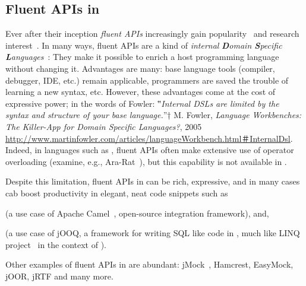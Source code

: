 \subsection{Fluent APIs in \Java}
Ever after their inception \emph{fluent APIs}
  increasingly gain popularity~\cite{Hibernate:06,Freeman:Pryce:06,Larsen:2012} and research
  interest~\cite{Deursen:2000,Kabanov:2008}.
In many ways, fluent APIs are a kind of
  \emph{internal} \emph{\textbf Domain \textbf Specific \textbf Languages}~\cite{VanDeursen:Klint:2000,Hudak:1997,Fowler:2010}:
They make it possible to enrich a host programming language without changing it.
Advantages are many: base language tools (compiler, debugger, IDE, etc.) remain
  applicable, programmers are saved the trouble of learning a new syntax, etc.
However, these advantages come at the cost of expressive power;
  in the words of Fowler:
  ‟\emph{Internal DSLs are limited by the syntax and structure of your base language.}”†
  {M. Fowler, \emph{Language Workbenches: The Killer-App for Domain Specific Languages?},
    2005
    \newline
  \url{http://www.martinfowler.com/articles/languageWorkbench.html＃InternalDsl}}.
Indeed, in languages such as \CC, fluent APIs
  often make extensive use of operator overloading (examine, e.g., \textsf{Ara-Rat}~\cite{Gil:Lenz:07}),
  but this capability is not available in \Java.

Despite this limitation, fluent APIs in \Java can be rich, expressive,
and in many cases cab boost productivity in elegant, neat code snippets such as

\begin{quote}
\end{quote}

(a use case of Apache Camel~\cite{Ibsen:Anstey:10}, open-source integration
framework), and,

\begin{quote}
\end{quote}

(a use case of jOOQ, a framework for writing SQL
like code in \Java, much like LINQ project~\cite{Meijer:Beckman:Bierman:06} in
the context of \CSharp).

Other examples of fluent APIs in \Java are abundant:
jMock~\cite{Freeman:Pryce:06},
Hamcrest,
EasyMock,
jOOR,
jRTF
and many more.


